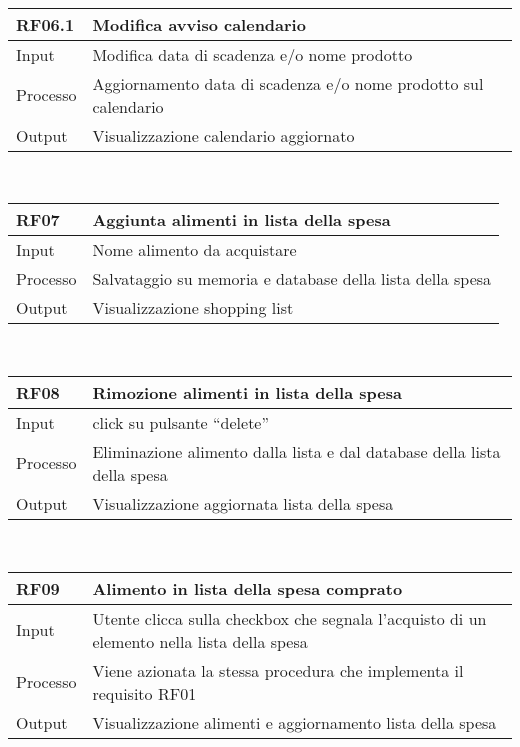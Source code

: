 \documentclass[
]{article}
\begin{document}
~

~

~

\begin{longtable}[]{@{}ll@{}}
\toprule\noalign{}
RF06.1 & Modifica avviso calendario \\
\midrule\noalign{}
\endhead
\bottomrule\noalign{}
\endlastfoot
Input & Modifica data di scadenza e/o nome prodotto \\
Processo & Aggiornamento data di scadenza e/o nome prodotto sul
calendario \\
Output & Visualizzazione calendario aggiornato \\
\end{longtable}

~

\begin{longtable}[]{@{}ll@{}}
\toprule\noalign{}
RF07 & Aggiunta alimenti in lista della spesa \\
\midrule\noalign{}
\endhead
\bottomrule\noalign{}
\endlastfoot
Input & Nome alimento da acquistare \\
Processo & Salvataggio su memoria e database della lista della spesa \\
Output & Visualizzazione shopping list \\
\end{longtable}

~

\begin{longtable}[]{@{}ll@{}}
\toprule\noalign{}
RF08 & Rimozione alimenti in lista della spesa \\
\midrule\noalign{}
\endhead
\bottomrule\noalign{}
\endlastfoot
Input & click su pulsante ``delete'' \\
Processo & Eliminazione alimento dalla lista e dal database della lista
della spesa \\
Output & Visualizzazione aggiornata lista della spesa \\
\end{longtable}

~

\begin{longtable}[]{@{}ll@{}}
\toprule\noalign{}
RF09 & Alimento in lista della spesa comprato \\
\midrule\noalign{}
\endhead
\bottomrule\noalign{}
\endlastfoot
Input & Utente clicca sulla checkbox che segnala l'acquisto di un
elemento nella lista della spesa \\
Processo & Viene azionata la stessa procedura che implementa il
requisito RF01 \\
Output & Visualizzazione alimenti e aggiornamento lista della spesa \\
\end{longtable}
\end{document}
